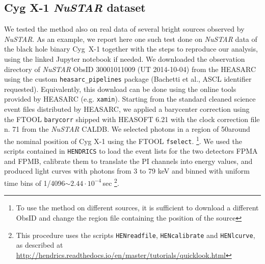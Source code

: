\documentclass[twocolumn]{aastex61}
\newcommand{\project}[1]{\textsl{#1}}
\newcommand{\nustar}{\project{NuSTAR}\xspace}
\begin{document}
\subsection{Cyg X-1 \nustar dataset}
We tested the method also on real data of several bright sources observed by \nustar.
As an example, we report here one such test done on \nustar data of the black hole binary Cyg~X-1 together with the steps to reproduce our analysis, using the linked Jupyter notebook if needed.
We downloaded the observation directory of \nustar ObsID 30001011009 (UT 2014-10-04) from the HEASARC using the custom \texttt{heasarc\_pipelines} package (Bachetti et al., ASCL identifier requested). 
Equivalently, this download can be done using the online tools provided by HEASARC (e.g. \texttt{xamin}).
Starting from the standard cleaned science event files distributed by HEASARC, we applied a barycenter correction using the FTOOL \texttt{barycorr} shipped with HEASOFT 6.21 with the clock correction file n. 71 from the \nustar CALDB.
We selected photons in a region of 50\arcsec around the nominal position of Cyg X-1 using the FTOOL \texttt{fselect}.%
\footnote{To use the method on different sources, it is sufficient to download a different ObsID and change the region file containing the position of the source}.
We used the scripts contained in \texttt{HENDRICS} to load the event lists for the two detectors FPMA and FPMB, calibrate them to translate the PI channels into energy values, and produced light curves with photons from 3 to 79 keV and binned with uniform time bins of 1/4096$\sim2.44\cdot10^{-4}$\,sec%
\footnote{This procedure uses the scripts \texttt{HENreadfile}, \texttt{HENcalibrate} and \texttt{HENlcurve}, as described at\\ \href{http://hendrics.readthedocs.io/en/master/tutorials/quicklook.html}{http://hendrics.readthedocs.io/en/master/tutorials/quicklook.html}}.
\end{document}
